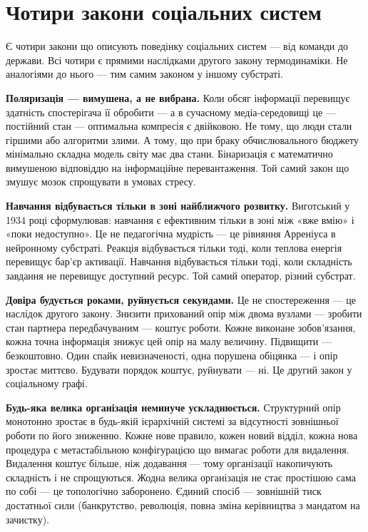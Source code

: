 \documentclass[12pt, a4paper, openany]{book}
\begin{document}
\section{Чотири закони соціальних систем}

Є чотири закони що описують поведінку соціальних систем --- від команди до держави. Всі чотири є прямими наслідками другого закону термодинаміки. Не аналогіями до нього --- тим самим законом у іншому субстраті.

\textbf{Поляризація — вимушена, а не вибрана.} Коли обсяг інформації перевищує здатність спостерігача її обробити --- а в сучасному медіа-середовищі це — постійний стан --- оптимальна компресія є двійковою. Не тому, що люди стали гіршими або алгоритми злими. А тому, що при браку обчислювального бюджету мінімально складна модель світу має два стани. Бінаризація є математично вимушеною відповіддю на інформаційне перевантаження. Той самий закон що змушує мозок спрощувати в умовах стресу.

\textbf{Навчання відбувається тільки в зоні найближчого розвитку.} Виготський у 1934 році сформулював: навчання є ефективним тільки в зоні між «вже вмію» і «поки недоступно». Це не педагогічна мудрість --- це рівняння Арреніуса в нейронному субстраті. Реакція відбувається тільки тоді, коли теплова енергія перевищує бар'єр активації. Навчання відбувається тільки тоді, коли складність завдання не перевищує доступний ресурс. Той самий оператор, різний субстрат.

\textbf{Довіра будується роками, руйнується секундами.} Це не спостереження --- це наслідок другого закону. Знизити прихований опір між двома вузлами --- зробити стан партнера передбачуваним --- коштує роботи. Кожне виконане зобов'язання, кожна точна інформація знижує цей опір на малу величину. Підвищити --- безкоштовно. Один спайк невизначеності, одна порушена обіцянка --- і опір зростає миттєво. Будувати порядок коштує, руйнувати --- ні. Це другий закон у соціальному графі.

\textbf{Будь-яка велика організація неминуче ускладнюється.} Структурний опір монотонно зростає в будь-якій ієрархічній системі за відсутності зовнішньої роботи по його зниженню. Кожне нове правило, кожен новий відділ, кожна нова процедура є метастабільною конфігурацією що вимагає роботи для видалення. Видалення коштує більше, ніж додавання --- тому організації накопичують складність і не спрощуються. Жодна велика організація не стає простішою сама по собі --- це топологічно заборонено. Єдиний спосіб --- зовнішній тиск достатньої сили (банкрутство, революція, повна зміна керівництва з мандатом на зачистку).
\end{document}

